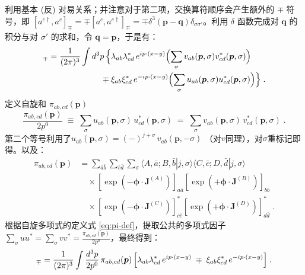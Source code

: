 利用基本 (反) 对易关系；并注意对于第二项，交换算符顺序会产生额外的 $\mp$ 符号，即 $[a^{c\dagger}, a^c]_{\mp} = \mp[a^c, a^{c\dagger}]_{\mp} = \mp \delta^3(\boldsymbol{p}-\boldsymbol{q})\delta_{\sigma\sigma'}$。利用 $\delta$ 函数完成对 $\boldsymbol{q}$ 的积分与对 $\sigma'$ 的求和，令 $\boldsymbol{q}=\boldsymbol{p}$，于是有：
\begin{align*}
  [\Psi_{ab}(x),\,\widetilde{\Psi}_{cd}^{\dagger}(y)]_{\mp} 
  ={}& \frac{1}{(2\pi)^{3}} \int d^3p \, \Bigl\{ \lambda_{ab}\lambda_{cd}^*\, e^{ip\cdot(x-y)} \Bigl( \sum_{\sigma} v_{ab}(\boldsymbol{p},\sigma)v_{cd}^*(\boldsymbol{p},\sigma) \Bigr) \\
  &\qquad\qquad\quad \mp \xi_{ab}\xi_{cd}^*\, e^{-ip\cdot(x-y)} \Bigl( \sum_{\sigma} u_{ab}(\boldsymbol{p},\sigma)u_{cd}^*(\boldsymbol{p},\sigma) \Bigr) \Bigr\}\;.
\end{align*}
定义自旋和
$\pi_{ab,cd}(\boldsymbol{p})$
\begin{equation}\label{eq:pi-def}
  \frac{\pi_{ab,cd}(\boldsymbol{p})}{2p^{0}}
  \;\equiv\; \sum_{\sigma}u_{ab}(\boldsymbol{p},\sigma)\,
    u_{cd}^{*}(\boldsymbol{p},\sigma)
  \;=\; \sum_{\sigma}v_{ab}(\boldsymbol{p},\sigma)\,
    v_{cd}^{*}(\boldsymbol{p},\sigma)\;.
\end{equation}
第二个等号利用了$u_{ab}(\boldsymbol{p},\sigma)=(-)^{j+\sigma}\,v_{ab}(\boldsymbol{p},-\sigma)$
（对$v$同理），对$\sigma$重标记即得。以及：
\begin{equation}
\begin{aligned}
    \pi_{ab,cd}(\boldsymbol{p}) &= \sum_{\bar{a}\bar{b}} \sum_{\bar{c}\bar{d}} \sum_{\sigma} \langle A, \bar{a}; B, \bar{b} | j, \sigma \rangle \langle C, \bar{c}; D, \bar{d} | j, \sigma \rangle \\
    &\quad \times \left[ \exp \left(-\boldsymbol{\phi} \cdot \boldsymbol{J}^{(A)}\right) \right]_{a\bar{a}} \left[ \exp \left(+\boldsymbol{\phi} \cdot \boldsymbol{J}^{(B)}\right) \right]_{b\bar{b}} \\
    &\quad \times \left[ \exp \left(-\boldsymbol{\phi} \cdot \boldsymbol{J}^{(C)}\right) \right]_{c\bar{c}}^* \left[ \exp \left(+\boldsymbol{\phi} \cdot \boldsymbol{J}^{(D)}\right) \right]_{d\bar{d}}^* \;.
\end{aligned}
\end{equation}
根据自旋多项式的定义式 \eqref{eq:pi-def}，提取公共的多项式因子 $\sum_\sigma u u^* = \sum_\sigma v v^* = \frac{\pi_{ab,cd}(\boldsymbol{p})}{2p^0}$，最终得到：
\begin{equation}
  [\Psi_{ab}(x),\,\widetilde{\Psi}_{cd}^{\dagger}(y)]_{\mp}
  = \frac{1}{(2\pi)^{3}}\int\frac{d^{3}p}{2p^{0}}\,
    \pi_{ab,cd}(\boldsymbol{p})\,
    \Bigl[\lambda_{ab}\lambda_{cd}^{*}\,e^{ip\cdot(x-y)}
      \;\mp\; \xi_{ab}\xi_{cd}^{*}\,e^{-ip\cdot(x-y)}\Bigr]\;.
\end{equation}
